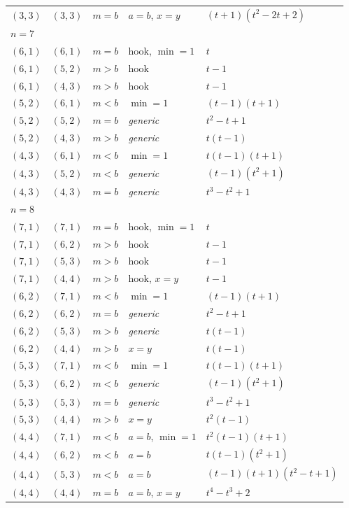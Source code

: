 \begin{longtable}{rrcll}
$(3,3)$ & $(3,3)$ & $m{=}b$ & $a{=}b$, $x{=}y$ & $\left(t + 1\right) \left(t^{2} - 2 t + 2\right)$\\
\multicolumn{5}{l}{\itshape $n=7$}\\
$(6,1)$ & $(6,1)$ & $m{=}b$ & hook, $\min{=}1$ & $t$\\
$(6,1)$ & $(5,2)$ & $m{>}b$ & hook & $t - 1$\\
$(6,1)$ & $(4,3)$ & $m{>}b$ & hook & $t - 1$\\
$(5,2)$ & $(6,1)$ & $m{<}b$ & $\min{=}1$ & $\left(t - 1\right) \left(t + 1\right)$\\
$(5,2)$ & $(5,2)$ & $m{=}b$ & \emph{generic} & $t^{2} - t + 1$\\
$(5,2)$ & $(4,3)$ & $m{>}b$ & \emph{generic} & $t \left(t - 1\right)$\\
$(4,3)$ & $(6,1)$ & $m{<}b$ & $\min{=}1$ & $t \left(t - 1\right) \left(t + 1\right)$\\
$(4,3)$ & $(5,2)$ & $m{<}b$ & \emph{generic} & $\left(t - 1\right) \left(t^{2} + 1\right)$\\
$(4,3)$ & $(4,3)$ & $m{=}b$ & \emph{generic} & $t^{3} - t^{2} + 1$\\
\multicolumn{5}{l}{\itshape $n=8$}\\
$(7,1)$ & $(7,1)$ & $m{=}b$ & hook, $\min{=}1$ & $t$\\
$(7,1)$ & $(6,2)$ & $m{>}b$ & hook & $t - 1$\\
$(7,1)$ & $(5,3)$ & $m{>}b$ & hook & $t - 1$\\
$(7,1)$ & $(4,4)$ & $m{>}b$ & hook, $x{=}y$ & $t - 1$\\
$(6,2)$ & $(7,1)$ & $m{<}b$ & $\min{=}1$ & $\left(t - 1\right) \left(t + 1\right)$\\
$(6,2)$ & $(6,2)$ & $m{=}b$ & \emph{generic} & $t^{2} - t + 1$\\
$(6,2)$ & $(5,3)$ & $m{>}b$ & \emph{generic} & $t \left(t - 1\right)$\\
$(6,2)$ & $(4,4)$ & $m{>}b$ & $x{=}y$ & $t \left(t - 1\right)$\\
$(5,3)$ & $(7,1)$ & $m{<}b$ & $\min{=}1$ & $t \left(t - 1\right) \left(t + 1\right)$\\
$(5,3)$ & $(6,2)$ & $m{<}b$ & \emph{generic} & $\left(t - 1\right) \left(t^{2} + 1\right)$\\
$(5,3)$ & $(5,3)$ & $m{=}b$ & \emph{generic} & $t^{3} - t^{2} + 1$\\
$(5,3)$ & $(4,4)$ & $m{>}b$ & $x{=}y$ & $t^{2} \left(t - 1\right)$\\
$(4,4)$ & $(7,1)$ & $m{<}b$ & $a{=}b$, $\min{=}1$ & $t^{2} \left(t - 1\right) \left(t + 1\right)$\\
$(4,4)$ & $(6,2)$ & $m{<}b$ & $a{=}b$ & $t \left(t - 1\right) \left(t^{2} + 1\right)$\\
$(4,4)$ & $(5,3)$ & $m{<}b$ & $a{=}b$ & $\left(t - 1\right) \left(t + 1\right) \left(t^{2} - t + 1\right)$\\
$(4,4)$ & $(4,4)$ & $m{=}b$ & $a{=}b$, $x{=}y$ & $t^{4} - t^{3} + 2$\\
\bottomrule\end{longtable}
